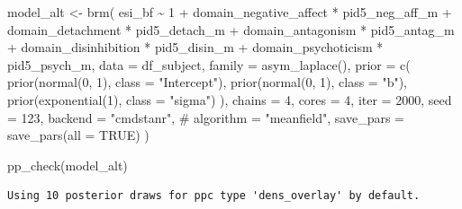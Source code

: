 \documentclass[
  11pt,
  a4paper,
  onecolumn]{article}
\newenvironment{Shaded}{}{}
\newcommand{\AttributeTok}[1]{\textcolor[rgb]{0.84,0.23,0.29}{#1}}
\newcommand{\CommentTok}[1]{\textcolor[rgb]{0.42,0.45,0.49}{#1}}
\newcommand{\ConstantTok}[1]{\textcolor[rgb]{0.00,0.36,0.77}{#1}}
\newcommand{\DecValTok}[1]{\textcolor[rgb]{0.00,0.36,0.77}{#1}}
\newcommand{\FunctionTok}[1]{\textcolor[rgb]{0.44,0.26,0.76}{#1}}
\newcommand{\NormalTok}[1]{\textcolor[rgb]{0.14,0.16,0.18}{#1}}
\newcommand{\OtherTok}[1]{\textcolor[rgb]{0.44,0.26,0.76}{#1}}
\newcommand{\SpecialCharTok}[1]{\textcolor[rgb]{0.00,0.36,0.77}{#1}}
\newcommand{\StringTok}[1]{\textcolor[rgb]{0.01,0.18,0.38}{#1}}
\begin{document}
\begin{Shaded}
\begin{Highlighting}[]
\NormalTok{model\_alt }\OtherTok{\textless{}{-}} \FunctionTok{brm}\NormalTok{(}
\NormalTok{  esi\_bf }\SpecialCharTok{\textasciitilde{}} \DecValTok{1} \SpecialCharTok{+}
\NormalTok{    domain\_negative\_affect }\SpecialCharTok{*}\NormalTok{ pid5\_neg\_aff\_m }\SpecialCharTok{+}
\NormalTok{    domain\_detachment }\SpecialCharTok{*}\NormalTok{ pid5\_detach\_m }\SpecialCharTok{+}
\NormalTok{    domain\_antagonism }\SpecialCharTok{*}\NormalTok{ pid5\_antag\_m }\SpecialCharTok{+}
\NormalTok{    domain\_disinhibition }\SpecialCharTok{*}\NormalTok{ pid5\_disin\_m }\SpecialCharTok{+}
\NormalTok{    domain\_psychoticism }\SpecialCharTok{*}\NormalTok{ pid5\_psych\_m,}
  \AttributeTok{data =}\NormalTok{ df\_subject,}
  \AttributeTok{family =} \FunctionTok{asym\_laplace}\NormalTok{(),}
  \AttributeTok{prior =} \FunctionTok{c}\NormalTok{(}
    \FunctionTok{prior}\NormalTok{(}\FunctionTok{normal}\NormalTok{(}\DecValTok{0}\NormalTok{, }\DecValTok{1}\NormalTok{), }\AttributeTok{class =} \StringTok{"Intercept"}\NormalTok{),}
    \FunctionTok{prior}\NormalTok{(}\FunctionTok{normal}\NormalTok{(}\DecValTok{0}\NormalTok{, }\DecValTok{1}\NormalTok{), }\AttributeTok{class =} \StringTok{"b"}\NormalTok{),}
    \FunctionTok{prior}\NormalTok{(}\FunctionTok{exponential}\NormalTok{(}\DecValTok{1}\NormalTok{), }\AttributeTok{class =} \StringTok{"sigma"}\NormalTok{)}
\NormalTok{  ),}
  \AttributeTok{chains =} \DecValTok{4}\NormalTok{,}
  \AttributeTok{cores =} \DecValTok{4}\NormalTok{,}
  \AttributeTok{iter =} \DecValTok{2000}\NormalTok{,}
  \AttributeTok{seed =} \DecValTok{123}\NormalTok{,}
  \AttributeTok{backend =} \StringTok{"cmdstanr"}\NormalTok{,}
  \CommentTok{\# algorithm = "meanfield",}
  \AttributeTok{save\_pars =} \FunctionTok{save\_pars}\NormalTok{(}\AttributeTok{all =} \ConstantTok{TRUE}\NormalTok{)}
\NormalTok{)}
\end{Highlighting}
\end{Shaded}

\begin{Shaded}
\begin{Highlighting}[]
\FunctionTok{pp\_check}\NormalTok{(model\_alt)}
\end{Highlighting}
\end{Shaded}

\begin{verbatim}
Using 10 posterior draws for ppc type 'dens_overlay' by default.
\end{verbatim}
\end{document}
